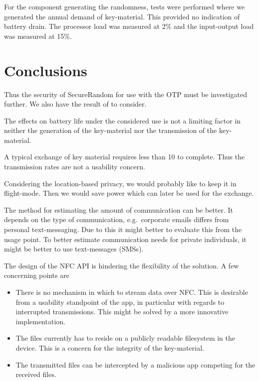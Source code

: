 For the component generating the randomness, tests were performed where we 
generated the annual demand of key-material.
This provided no indication of battery drain.
The processor load was measured at \unit{2}{\%} and the input-output load was 
  measured at \unit{15}{\%}. 


\section{Conclusions}
\label{sec:Conclusions}

Thus the security of SecureRandom for use with the \ac{OTP} must be 
investigated further.
We also have the result of \citet{UniversalityOTP} to consider.

The effects on battery life under the considered use is not a limiting factor 
in neither the generation of the key-material nor the transmission of the 
key-material. 

A typical exchange of key material requires less than \unit{10}{\second} to 
complete.
Thus the transmission rates are not a usability concern.

Considering the location-based privacy, we would probably like to keep it in 
flight-mode.
Then we would save power which can later be used for the exchange.

The method for estimating the amount of communication can be better.
It depends on the type of communication, e.g.~corporate emails differs from 
personal text-messaging.
Due to this it might better to evaluate this from the usage point.
To better estimate communication needs for private individuals, it might be 
better to use text-messages (SMSs).

The design of the \ac{NFC} API is hindering the flexibility of the solution.  
A few concerning points are
\begin{itemize}
  \item There is no mechanism in which to stream data over \ac{NFC}\@.
    This is desirable from a usability standpoint of the app, in particular 
    with regards to interrupted transmissions.
    This might be solved by a more innovative implementation.
  \item The files currently has to reside on a publicly readable filesystem in 
    the device.
    This is a concern for the integrity of the key-material.
  \item The transmitted files can be intercepted by a malicious app competing 
    for the received files.
\end{itemize}

